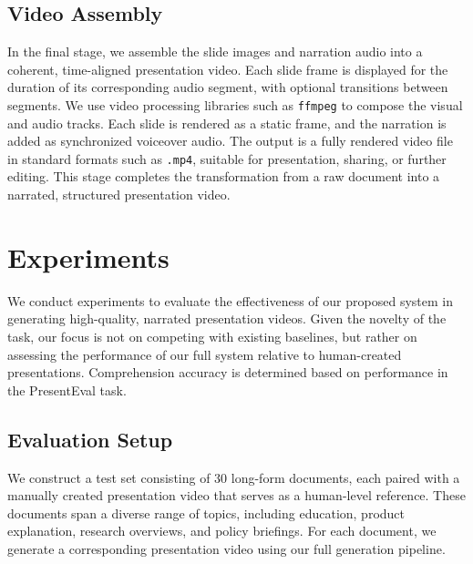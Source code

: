 \documentclass[11pt]{article}
\begin{document}
\subsection{Video Assembly}

In the final stage, we assemble the slide images and narration audio into a coherent, time-aligned presentation video. Each slide frame is displayed for the duration of its corresponding audio segment, with optional transitions between segments. We use video processing libraries such as \texttt{ffmpeg} to compose the visual and audio tracks. Each slide is rendered as a static frame, and the narration is added as synchronized voiceover audio. The output is a fully rendered video file in standard formats such as \texttt{.mp4}, suitable for presentation, sharing, or further editing. This stage completes the transformation from a raw document into a narrated, structured presentation video.










 
 







\section{Experiments}

We conduct experiments to evaluate the effectiveness of our proposed system in generating high-quality, narrated presentation videos. Given the novelty of the task, our focus is not on competing with existing baselines, but rather on assessing the performance of our full system relative to human-created presentations.
Comprehension accuracy is determined based on performance in the PresentEval task.


\subsection{Evaluation Setup}

We construct a test set consisting of 30 long-form documents, each paired with a manually created presentation video that serves as a human-level reference. These documents span a diverse range of topics, including education, product explanation, research overviews, and policy briefings. For each document, we generate a corresponding presentation video using our full generation pipeline.
\end{document}
